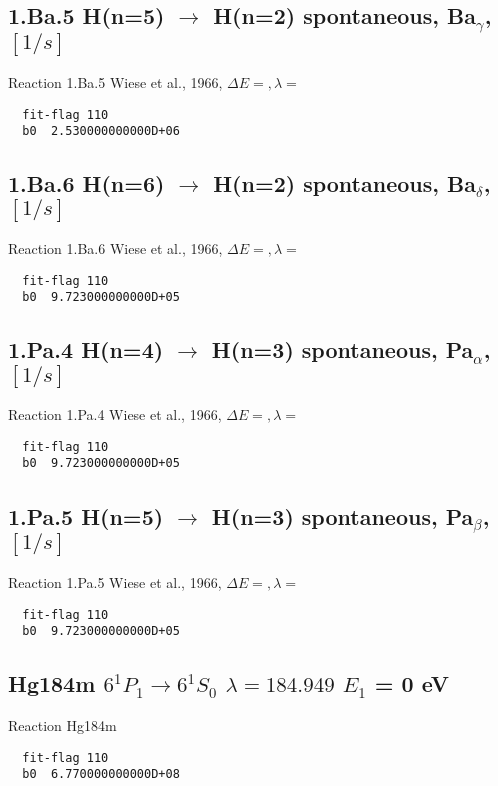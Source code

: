 \documentclass[12pt]{article}
\begin{document}
\subsection{
1.Ba.5   H(n=5) $\rightarrow$ H(n=2) spontaneous,  Ba$_\gamma$, $[1/s]$
}
Reaction 1.Ba.5 
Wiese et al., 1966, $\Delta E=     ,\lambda=  $
\begin{small}\begin{verbatim}
  fit-flag 110
  b0  2.530000000000D+06
\end{verbatim}\end{small}
\subsection{
1.Ba.6   H(n=6) $\rightarrow$ H(n=2) spontaneous,  Ba$_\delta$, $[1/s]$
}
Reaction 1.Ba.6 
Wiese et al., 1966, $\Delta E=     ,\lambda=  $
\begin{small}\begin{verbatim}
  fit-flag 110
  b0  9.723000000000D+05
\end{verbatim}\end{small}
\subsection{
1.Pa.4   H(n=4) $\rightarrow$ H(n=3) spontaneous,  Pa$_\alpha$, $[1/s]$
}
Reaction 1.Pa.4
Wiese et al., 1966, $\Delta E=     ,\lambda=  $
\begin{small}\begin{verbatim}
  fit-flag 110
  b0  9.723000000000D+05
\end{verbatim}\end{small}
\subsection{
1.Pa.5   H(n=5) $\rightarrow$ H(n=3) spontaneous,  Pa$_\beta$, $[1/s]$
}
Reaction 1.Pa.5
Wiese et al., 1966, $\Delta E=     ,\lambda=  $
\begin{small}\begin{verbatim}
  fit-flag 110
  b0  9.723000000000D+05
\end{verbatim}\end{small}
\newpage
\subsection{
Hg184m   $6^1P_1 \rightarrow 6^1S_0 $ $\lambda= 184.949$ $E_1$ = 0 eV
}
Reaction Hg184m
\begin{small}\begin{verbatim}
  fit-flag 110
  b0  6.770000000000D+08
\end{verbatim}\end{small}
\end{document}
